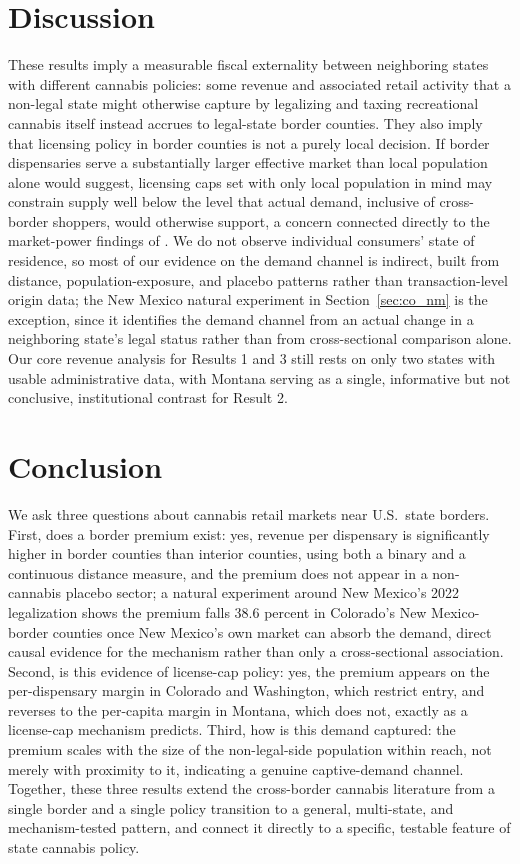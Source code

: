 \documentclass[12pt]{article}
\begin{document}
\section{Discussion}

These results imply a measurable fiscal externality between neighboring states with different cannabis
policies: some revenue and associated retail activity that a non-legal state might otherwise capture by
legalizing and taxing recreational cannabis itself instead accrues to legal-state border counties. They also
imply that licensing policy in border counties is not a purely local decision. If border dispensaries serve
a substantially larger effective market than local population alone would suggest, licensing caps set with
only local population in mind may constrain supply well below the level that actual demand, inclusive of
cross-border shoppers, would otherwise support, a concern connected directly to the market-power findings of
\citet{HollenbeckUetake2021}. We do not observe individual consumers' state of residence, so most of our
evidence on the demand channel is indirect, built from distance, population-exposure, and placebo patterns
rather than transaction-level origin data; the New Mexico natural experiment in Section~\ref{sec:co_nm} is
the exception, since it identifies the demand channel from an actual change in a neighboring state's legal
status rather than from cross-sectional comparison alone. Our core revenue analysis for Results 1 and 3 still
rests on only two states with usable administrative data, with Montana serving as a single, informative but
not conclusive, institutional contrast for Result 2.

\section{Conclusion}

We ask three questions about cannabis retail markets near U.S.\ state borders. First, does a border premium
exist: yes, revenue per dispensary is significantly higher in border counties than interior counties, using
both a binary and a continuous distance measure, and the premium does not appear in a non-cannabis placebo
sector; a natural experiment around New Mexico's 2022 legalization shows the premium falls 38.6 percent in
Colorado's New Mexico-border counties once New Mexico's own market can absorb the demand, direct causal
evidence for the mechanism rather than only a cross-sectional association. Second, is this evidence of
license-cap policy: yes, the premium appears on the per-dispensary margin
in Colorado and Washington, which restrict entry, and reverses to the per-capita margin in Montana, which
does not, exactly as a license-cap mechanism predicts. Third, how is this demand captured: the premium scales
with the size of the non-legal-side population within reach, not merely with proximity to it, indicating a
genuine captive-demand channel. Together, these three results extend the cross-border cannabis literature
\citep{HansenMillerWeber2020,HaoCowan2020} from a single border and a single policy transition to a general,
multi-state, and mechanism-tested pattern, and connect it directly to a specific, testable feature of state
cannabis policy.
\end{document}
